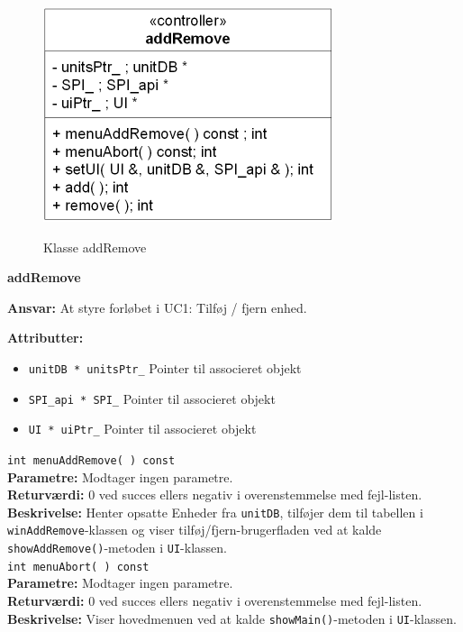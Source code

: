 \newpage

\begin{figure}[htbp] \centering
{\includegraphics[scale=1.5]{filer/design/Klassediagrammer/sw_addRemove}}
\caption{Klasse addRemove}
\label{fig:addRemove klassediagram}
\end{figure} 

{\centering
\textbf{addRemove}\par
}
\textbf{Ansvar:} At styre forløbet i UC1: Tilføj / fjern enhed. \

\textbf{Attributter:}
\begin{itemize}
	\item \verb+unitDB * unitsPtr_+ Pointer til associeret objekt
	\item \verb+SPI_api * SPI_+ Pointer til associeret objekt
	\item \verb+UI * uiPtr_+ Pointer til associeret objekt
\end{itemize}

\verb+int menuAddRemove( ) const+ \\
\textbf{Parametre:} Modtager ingen parametre. \\
\textbf{Returværdi:} 0 ved succes ellers negativ i overenstemmelse med fejl-listen. \\
\textbf{Beskrivelse:} Henter opsatte Enheder fra \verb+unitDB+, tilføjer dem til tabellen i \verb+winAddRemove+-klassen og viser tilføj/fjern-brugerfladen ved at kalde \verb+showAddRemove()+-metoden i \verb+UI+-klassen.\\

\verb+int menuAbort( ) const+ \\
\textbf{Parametre:} Modtager ingen parametre. \\
\textbf{Returværdi:} 0 ved succes ellers negativ i overenstemmelse med fejl-listen. \\
\textbf{Beskrivelse:} Viser hovedmenuen ved at kalde \verb+showMain()+-metoden i \verb+UI+-klassen.\\

